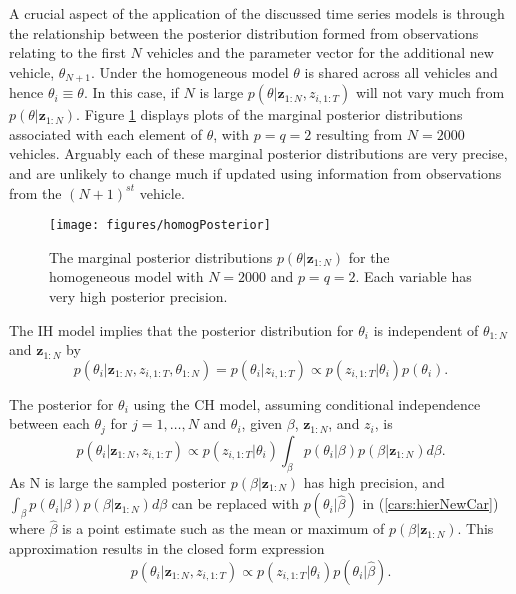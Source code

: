 \documentclass[
12pt, %
onehalfspacing, %
nohyperref, %
headsepline, %
chapterinoneline, %
]{MastersDoctoralThesis} %
\begin{document}
A crucial aspect of the application of the discussed time series models is through the relationship between the posterior distribution formed from observations relating to the first $N$ vehicles and the parameter vector for the additional new vehicle, $\theta_{N+1}$. Under the homogeneous model $\theta$ is shared across all vehicles and hence $\theta_{i} \equiv \theta$. In this case, if $N$ is large $p(\theta | \textbf{z}_{1:N}, z_{i, 1:T})$ will not vary much from $p(\theta | \textbf{z}_{1:N})$. Figure \ref{fig:carshomogPosterior} displays plots of the marginal posterior distributions associated with each element of $\theta$, with $p = q = 2$ resulting from $N = 2000$ vehicles. Arguably each of these marginal posterior distributions are very precise, and are unlikely to change much if updated using information from observations from the $(N+1)^{st}$ vehicle.

\begin{figure}[htbp]
\centering
\texttt{[image: figures/homogPosterior]}
\caption{The marginal posterior distributions $p(\theta | \textbf{z}_{1:N})$ for the homogeneous model with $N = 2000$ and $p = q = 2$. Each variable has very high posterior precision.}
\label{fig:carshomogPosterior}
\end{figure}

The IH model implies that the posterior distribution for $\theta_i$ is independent of $\theta_{1:N}$ and $\textbf{z}_{1:N}$ by
\begin{equation}
p(\theta_{i}| \textbf{z}_{1:N}, z_{i,1:T}, \theta_{1:N}) = p(\theta_{i} | z_{i, 1:T}) \propto p(z_{i, 1:T} | \theta_i) p(\theta_i).
\label{cars:indepNewCar}
\end{equation}

The posterior for $\theta_i$ using the CH model, assuming conditional independence between each $\theta_j$ for $j = 1, \ldots, N$ and $\theta_i$, given $\beta$, $\textbf{z}_{1:N}$, and $z_i$, is
\begin{equation}
\label{cars:hierNewCar}
p(\theta_{i} | \textbf{z}_{1:N}, z_{i, 1:T}) \propto p(z_{i, 1:T} | \theta_{i}) \int_{\beta} p(\theta_{i} | \beta) p (\beta | \textbf{z}_{1:N}) d\beta.
\end{equation}
As N is large the sampled posterior $p(\beta | \textbf{z}_{1:N})$ has high precision, and $\int_{\beta} p(\theta_{i} | \beta) p (\beta | \textbf{z}_{1:N}) d\beta$ can be replaced with $p(\theta_{i} | \hat{\beta})$ in (\ref{cars:hierNewCar}) where $\hat{\beta}$ is a point estimate such as the mean or maximum of $p(\beta | \textbf{z}_{1:N})$. This approximation results in the closed form expression
\begin{equation}
\label{cars:hierNewCar2}
p(\theta_{i} | \textbf{z}_{1:N}, z_{i, 1:T}) \propto p(z_{i, 1:T} | \theta_{i}) p(\theta_{i} | \hat{\beta}).
\end{equation}
\end{document}
